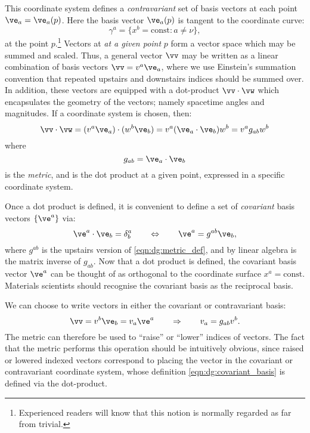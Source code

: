 This coordinate system defines a {\em contravariant\/} set of basis vectors at each point $\ve_a = \ve_a(p)$. Here the basis vector $\ve_a(p)$ is tangent to the coordinate curve:
\begin{equation}
  \gamma^a = \{x^b=\mathrm{const} : a\ne \nu\},
  \label{eqn:dg:coordinate_curve}
\end{equation}
at the point $p$.\footnote{Experienced readers will know that this notion is normally regarded as far from trivial.}
  Vectors at {\em at a given point\/} $p$ form a vector space which may be summed and scaled. Thus, a general vector $\vv$ may be written as a linear combination of basis vectors $\vv = v^a \ve_a$, where we use Einstein's summation convention that repeated upstairs and downstairs indices should be summed over. In addition, these vectors are equipped with a dot-product $\vv\cdot\vw$ which encapsulates the geometry of the vectors; namely spacetime angles and magnitudes. If a coordinate system is chosen, then:
\begin{equation}
  \vv\cdot\vw = (v^a\ve_a)\cdot(w^b\ve_b) = v^a (\ve_a\cdot\ve_b)w^b =  v^a g_{ab} w^b
  \label{eqn:dg:dot_product}
\end{equation}
where 
\begin{equation}
  g_{ab} = \ve_a\cdot\ve_b
  \label{eqn:dg:metric_def}
\end{equation}
is the {\em metric}, and is the dot product at a given point, expressed in a specific coordinate system.

Once a dot product is defined, it is convenient to define a set of {\em covariant\/} basis vectors $\{\ve^a\}$ via:
\begin{equation}
  \ve^a \cdot \ve_b = \delta^a_b 
  \qquad\Leftrightarrow\qquad
  \ve^a = g^{ab} \ve_b,
  \label{eqn:dg:covariant_basis}
\end{equation}
where $g^{ab}$ is the upstairs version of \eqref{eqn:dg:metric_def}, and by linear algebra is the matrix inverse of $g_{ab}$. Now that a dot product is defined, the covariant basis vector $\ve^a$ can be thought of as orthogonal to the coordinate surface $x^a=\mathrm{const}$. Materials scientists should recognise the covariant basis as the reciprocal basis. 

We can choose to write vectors in either the covariant or contravariant basis:
\begin{equation}
  \vv=v^b \ve_b = v_a \ve^a 
  \qquad\Rightarrow\qquad
  v_a = g_{ab} v^b.
  \label{eqn:dg:covariant_vector}
\end{equation}
The metric can therefore be used to ``raise'' or ``lower'' indices of vectors. The fact that the metric performs this operation should be intuitively obvious, since raised or lowered indexed vectors correspond to placing the vector in the covariant or contravariant coordinate system, whose definition \eqref{eqn:dg:covariant_basis} is defined via the dot-product.


